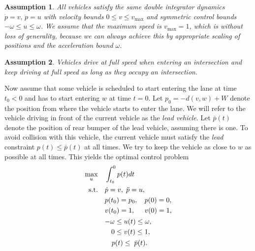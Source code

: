 \documentclass[a4paper]{article}
\theoremstyle{definition}
\theoremstyle{plain}
\newtheorem{assump}{Assumption\hspace{0.25em}\ignorespaces}
\begin{document}
\begin{assump}
  All vehicles satisfy the same double integrator dynamics
  $\dot{p} = v, \, \ddot{p} = u$ with velocity bounds
  $0 \leq v \leq v_{\max}$ and symmetric control
  bounds $-\omega \leq u \leq \omega$.
  We assume that the maximum
  speed is $v_{\max} = 1$, which is without loss of generality, because we can
  always achieve this by appropriate scaling of positions and the acceleration
  bound $\omega$.
\end{assump}

\begin{assump}
  \label{assump:full_speed}
  Vehicles drive at full speed when entering
  an intersection and keep driving at full speed as long as they occupy an
  intersection.
\end{assump}

Now assume that some vehicle is scheduled to start entering the lane at time
$t_{0} < 0$ and has to start entering $w$ at time $t=0$. Let
$p_{0} = -d(v,w) + W$ denote the position from where the vehicle starts to enter
the lane.
%
We will refer to the vehicle driving in front of the current vehicle as the
\emph{lead vehicle}. Let $\bar{p}(t)$ denote the position of rear bumper of the lead vehicle,
assuming there is one.
%
To avoid collision with this vehicle, the current vehicle must satisfy the \textit{lead}
constraint $p(t) \leq \bar{p}(t)$ at all times.
%
We try to keep the vehicle as close to $w$ as possible at all times. This yields
the optimal control problem
\begin{equation}
  \label{eq:optimal_control}
  \begin{aligned}
  \max_{u}    \quad & \int_{t_{0}}^{0} p(t) dt \\
    \begin{alignedat}{2}\text{s.t.}\\\\ {}\end{alignedat}
              \quad &\begin{alignedat}{2}
                     &\dot{p}=v, \; \ddot{p} = u , \\
                     &p(t_{0}) = p_{0} , \;\; &&  p(0) = 0 , \\
                     &v(t_{0}) = 1 ,  && v(0) = 1 , \\
                    \end{alignedat} \\
                    &\begin{alignedat}[t]{2}
                     {-\omega} \leq \; &u(t) \leq \omega , \\
                     0 \leq \; &v(t) \leq 1 , \\
                    \end{alignedat} \\
                    &\quad p(t) \leq \; \bar{p}(t) .
  \end{aligned}
\end{equation}
\end{document}
